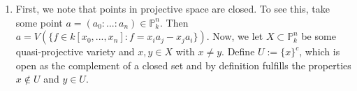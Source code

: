 \begin{exercise}{4}
    \begin{enumerate}
        \item First, we note that points in projective space are closed.
        To see this, take some point $a=(a_0:...:a_n)\in \mathbb{P}^n_k$.
        Then $a=V(\lbrace f\in k[x_0,...,x_n]: f=x_ia_j-x_ja_i \rbrace).$
        Now, we let $X\subset \mathbb{P}^n_k$ be some quasi-projective variety and
        $x,y\in X$ with $x\neq y$. Define $U:=\lbrace x \rbrace^c$, which is open as
        the complement of a closed set and by definition fulfills the properties
        $x\not \in U$ and $y \in U$.
     \end{enumerate}
\end{exercise}

